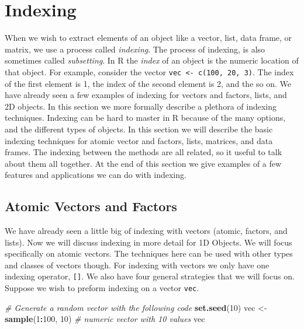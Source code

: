 \documentclass[
]{book}
\newenvironment{Shaded}{\begin{snugshade}}{\end{snugshade}}
\newcommand{\CommentTok}[1]{\textcolor[rgb]{0.56,0.35,0.01}{\textit{#1}}}
\newcommand{\DecValTok}[1]{\textcolor[rgb]{0.00,0.00,0.81}{#1}}
\newcommand{\KeywordTok}[1]{\textcolor[rgb]{0.13,0.29,0.53}{\textbf{#1}}}
\newcommand{\NormalTok}[1]{#1}
\newcommand{\OperatorTok}[1]{\textcolor[rgb]{0.81,0.36,0.00}{\textbf{#1}}}
\newcommand{\StringTok}[1]{\textcolor[rgb]{0.31,0.60,0.02}{#1}}
\begin{document}
\hypertarget{indexing}{%
\chapter{Indexing}\label{indexing}}

When we wish to extract elements of an object like a vector, list, data frame, or matrix, we use a process called \emph{indexing}. The process of indexing, is also sometimes called \emph{subsetting}. In R the \emph{index} of an object is the numeric location of that object. For example, consider the vector \texttt{vec\ \textless{}-\ c(100,\ 20,\ 3)}. The index of the first element is 1, the index of the second element is 2, and the so on. We have already seen a few examples of indexing for vectors and factors, lists, and 2D objects. In this section we more formally describe a plethora of indexing techniques. Indexing can be hard to master in R because of the many options, and the different types of objects. In this section we will describe the basic indexing techniques for atomic vector and factors, lists, matrices, and data frames. The indexing between the methods are all related, so it useful to talk about them all together. At the end of this section we give examples of a few features and applications we can do with indexing.

\hypertarget{VectorIndex}{%
\section{Atomic Vectors and Factors}\label{VectorIndex}}

We have already seen a little big of indexing with vectors (atomic, factors, and lists). Now we will discuss indexing in more detail for 1D Objects. We will focus specifically on atomic vectors. The techniques here can be used with other types and classes of vectors though. For indexing with vectors we only have one indexing operator, \texttt{{[}{]}}. We also have four general strategies that we will focus on. Suppose we wish to preform indexing on a vector \texttt{vec}.

\begin{Shaded}
\begin{Highlighting}[]
\CommentTok{# Generate a random vector with the following code}
\KeywordTok{set.seed}\NormalTok{(}\DecValTok{10}\NormalTok{)}
\NormalTok{vec <-}\StringTok{ }\KeywordTok{sample}\NormalTok{(}\DecValTok{1}\OperatorTok{:}\DecValTok{100}\NormalTok{, }\DecValTok{10}\NormalTok{)  }\CommentTok{# numeric vector with 10 values}
\NormalTok{vec}
\end{Highlighting}
\end{Shaded}
\end{document}
